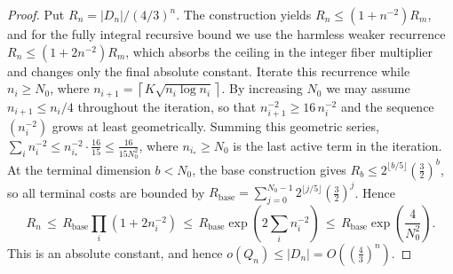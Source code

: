 \documentclass[10pt,a4paper]{amsart}
\begin{document}
\begin{proof}
Put $R_n=|D_n|/(4/3)^n$.  The construction yields $R_n\le (1+n^{-2})R_m$, and for the
fully integral recursive bound we use the harmless weaker recurrence
$R_n\le (1+2n^{-2})R_m$, which absorbs the ceiling in the integer fiber multiplier and
changes only the final absolute constant.  Iterate this recurrence while $n_i\ge N_0$,
where $n_{i+1}=\left\lceil K\sqrt{n_i\log n_i}\right\rceil$.
By increasing $N_0$ we may assume $n_{i+1}\le n_i/4$ throughout the iteration, so that
$n_{i+1}^{-2}\ge 16\,n_i^{-2}$ and the sequence $(n_i^{-2})$ grows at least geometrically.
Summing this geometric series, $\sum_i n_i^{-2}\le n_{i_*}^{-2}\cdot\frac{16}{15}\le
\frac{16}{15N_0^2}$, where $n_{i_*}\ge N_0$ is the last active term in the iteration.
At the terminal dimension $b<N_0$, the base construction gives
$R_b\le 2^{\lfloor b/5\rfloor}\left(\frac32\right)^b$, so all terminal costs are bounded by
$R_{\mathrm{base}}=\sum_{j=0}^{N_0-1}2^{\lfloor j/5\rfloor}\left(\frac32\right)^j$.  Hence
\[
R_n\,\le\, R_{\mathrm{base}}\prod_i(1+2n_i^{-2})
\,\le\, R_{\mathrm{base}}\exp\!\left(2\sum_i n_i^{-2}\right)
\,\le\, R_{\mathrm{base}}\exp\!\left(\frac{4}{N_0^2}\right).
\]
\label{lem:loss}
This is an absolute constant, and hence $o(Q_n)\le |D_n|=O\!\left(\left(\frac43\right)^n\right)$.
\end{proof}
\end{document}
